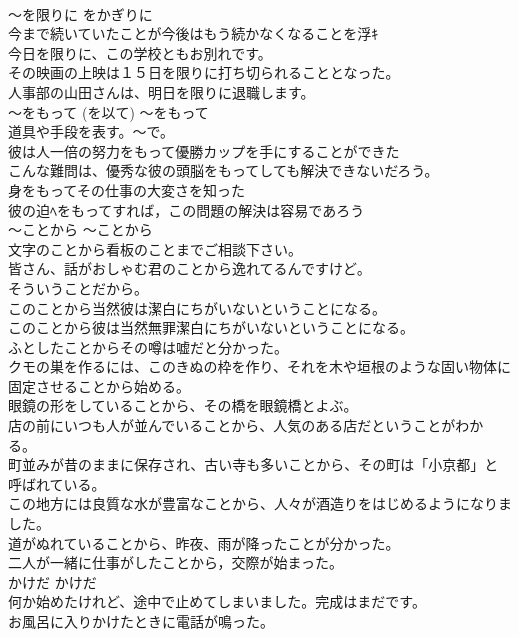 \documentclass[8pt]{extreport}
\begin{document}
\begin{CJK}{UTF8}{min}
\\	〜を限りに	をかぎりに	
\\	今まで続いていたことが今後はもう続かなくなることを浮ｷ	
\\	今日を限りに、この学校ともお別れです。  
\\	その映画の上映は１５日を限りに打ち切られることとなった。   
\\	人事部の山田さんは、明日を限りに退職します。   
\\	〜をもって (を以て)	〜をもって	
\\	道具や手段を表す。〜で。	
\\	彼は人一倍の努力をもって優勝カップを手にすることができた   
\\	こんな難問は、優秀な彼の頭脳をもってしても解決できないだろう。   
\\	身をもってその仕事の大変さを知った   
\\	彼の迫ﾍをもってすれば，この問題の解決は容易であろう   
\\	〜ことから	〜ことから	
\\	文字のことから看板のことまでご相談下さい。  
\\	皆さん、話がおしゃむ君のことから逸れてるんですけど｡  
\\	そういうことだから。  
\\	このことから当然彼は潔白にちがいないということになる。   
\\	このことから彼は当然無罪潔白にちがいないということになる。   
\\	ふとしたことからその噂は嘘だと分かった。  
\\	クモの巣を作るには、このきぬの枠を作り、それを木や垣根のような固い物体に固定させることから始める。   
\\	眼鏡の形をしていることから、その橋を眼鏡橋とよぶ。  
\\	店の前にいつも人が並んでいることから、人気のある店だということがわかる。  
\\	町並みが昔のままに保存され、古い寺も多いことから、その町は「小京都」と呼ばれている。  
\\	この地方には良質な水が豊富なことから、人々が酒造りをはじめるようになりました。  
\\	道がぬれていることから、昨夜、雨が降ったことが分かった。  
\\	二人が一緒に仕事がしたことから，交際が始まった。  
\\	かけだ	かけだ	
\\	何か始めたけれど、途中で止めてしまいました。完成はまだです。	
\\	お風呂に入りかけたときに電話が鳴った。  

\end{CJK}
\end{document}
